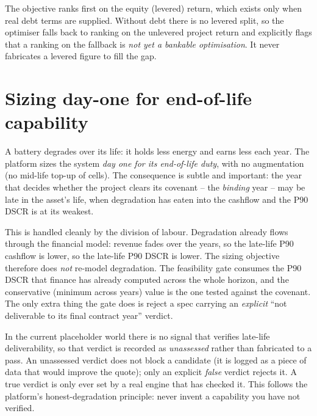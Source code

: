 \begin{keyidea}
The objective ranks first on the equity (levered) return, which exists only when real debt terms are supplied. Without debt there is no levered split, so the optimiser falls back to ranking on the unlevered project return and explicitly flags that a ranking on the fallback is \emph{not yet a bankable optimisation}. It never fabricates a levered figure to fill the gap.
\end{keyidea}

\section{Sizing day-one for end-of-life capability}

A battery degrades over its life: it holds less energy and earns less each year. The platform sizes the system \emph{day one for its end-of-life duty}, with no augmentation (no mid-life top-up of cells). The consequence is subtle and important: the year that decides whether the project clears its covenant -- the \emph{binding} year -- may be late in the asset's life, when degradation has eaten into the cashflow and the P90 DSCR is at its weakest.

This is handled cleanly by the division of labour. Degradation already flows through the financial model: revenue fades over the years, so the late-life P90 cashflow is lower, so the late-life P90 DSCR is lower. The sizing objective therefore does \emph{not} re-model degradation. The feasibility gate consumes the P90 DSCR that finance has already computed across the whole horizon, and the conservative (minimum across years) value is the one tested against the covenant. The only extra thing the gate does is reject a spec carrying an \emph{explicit} ``not deliverable to its final contract year'' verdict.

\begin{caution}
In the current placeholder world there is no signal that verifies late-life deliverability, so that verdict is recorded as \emph{unassessed} rather than fabricated to a pass. An unassessed verdict does not block a candidate (it is logged as a piece of data that would improve the quote); only an explicit \emph{false} verdict rejects it. A true verdict is only ever set by a real engine that has checked it. This follows the platform's honest-degradation principle: never invent a capability you have not verified.
\end{caution}

